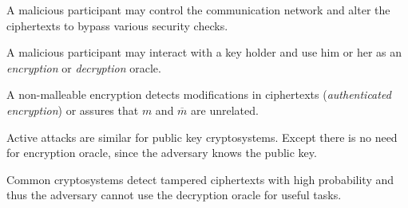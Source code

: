 \documentclass[landscape,footrule]{foils}
\begin{document}


\vspace*{1ex}
\begin{triangles}
\item A malicious participant may control the communication network
  and alter the ciphertexts to bypass various security checks.
\item A malicious participant may interact with a key holder and use
  him or her as an \emph{encryption} or \emph{decryption} oracle.
\item A non-malleable encryption  detects modifications in ciphertexts
  (\emph{authenticated encryption}) or assures that $m{}$ and
  $\overline{m{}}$ are unrelated.
\end{triangles}




\vspace*{1ex}
\begin{triangles}
\item Active attacks are similar for public key cryptosystems. Except
  there is no need for encryption oracle, since the adversary knows
  the public key.
\item Common cryptosystems detect tampered ciphertexts with
  high probability and thus the adversary cannot use the decryption
  oracle for useful tasks.
\end{triangles}

\end{document}
